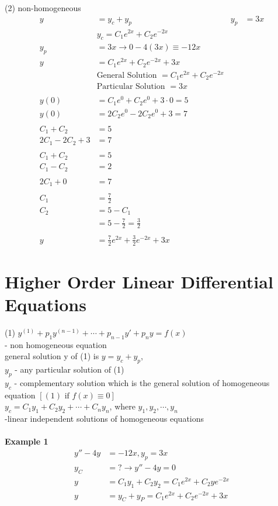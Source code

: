 \documentclass[10pt, letterpaper]{article}
\begin{document}
(2) non-homogeneous
\begin{align*}
y &= y_c +y_p & y_p &= 3x\\
& y_c =C_1e^{2x} +C_2e^{-2x}\\
y_p &= 3x \rightarrow 0 - 4(3x) \equiv -12x\\
y &= C_1e^{2x} +C_2e^{-2x} +3x\\
& \text{General Solution } = C_1e^{2x} +C_2e^{-2x}\\
& \text{Particular Solution } = 3x\\
\\
y(0) &= C_1e^0 +C_2e^0 +3 \cdot 0 =5\\
y(0) &= 2C_2e^0 -2C_2e^0 +3 =7\\
\\
C_1 +C_2 &= 5\\
2C_1 -2C_2 +3 &= 7\\
\\
C_1 +C_2 &= 5\\
C_1 -C_2 &= 2\\
\\
2C_1 +0 &= 7\\
\\
C_1 &= \frac{7}{2}\\
C_2 &= 5 -C_1\\
&= 5 -\frac{7}{2} = \frac{3}{2}\\
\\
y &= \frac{7}{2}e^{2x} +\frac{3}{2}e^{-2x} +3x
\end{align*}

\section{Higher Order Linear Differential Equations}
(1) $y^{(1)} +p_1y^{(n-1)} +\cdots +p_{n-1}y' +p_ny =f(x)$\\
- non homogeneous equation\\
general solution y of (1) is $y=y_c+y_p$,\\
$y_p$ - any particular solution of (1)\\
$y_c$ - complementary solution which is the general solution of homogeneous equation $[(1) \text{ if } f(x) \equiv 0]$\\
$y_c =C_1y_1 +C_2y_2 +\cdots +C_ny_n$, where $y_1, y_2, \cdots, y_n$\\
-linear independent solutions of homogeneous equations\\
\\
\textbf{Example 1}\\
\begin{align*}
y'' -4y &=-12x, y_p =3x\\
y_C &= ? \rightarrow y'' -4y =0\\
y &= C_1y_1 + C_2y_2 = C_1e^{2x} +C_2ye^{-2x}\\
y &= y_C +y_P =C_1e^{2x} +C_2e^{-2x} +3x\\
\end{align*}
\end{document}
